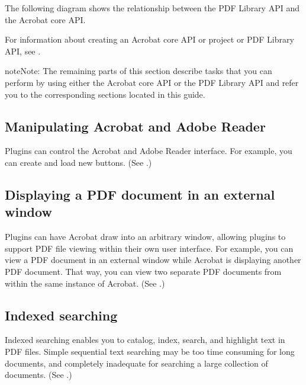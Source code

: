 \documentclass[letterpaper,12pt,english,openany,oneside]{sphinxmanual}
\begin{document}
The following diagram shows the relationship between the PDF Library API and the Acrobat core API.

\noindent{}

For information about creating an Acrobat core API or project or PDF Library API, see .

\begin{sphinxadmonition}{note}{Note:}
The remaining parts of this section describe tasks that you can perform by using either the Acrobat core API or the PDF Library API and refer you to the corresponding sections located in this guide.
\end{sphinxadmonition}


\subsection{Manipulating Acrobat and Adobe Reader}
\label{\detokenize{index:manipulating-acrobat-and-adobe-reader}}
Plugins can control the Acrobat and Adobe Reader interface. For example, you can create and load new buttons. (See .)


\subsection{Displaying a PDF document in an external window}
\label{\detokenize{index:displaying-a-pdf-document-in-an-external-window}}
Plugins can have Acrobat draw into an arbitrary window, allowing plugins to support PDF file viewing within their own user interface. For example, you can view a PDF document in an external window while Acrobat is displaying another PDF document. That way, you can view two separate PDF documents from within the same instance of Acrobat. (See .)


\subsection{Indexed searching}
\label{\detokenize{index:indexed-searching}}
Indexed searching enables you to catalog, index, search, and highlight text in PDF files. Simple sequential text searching may be too time consuming for long documents, and completely inadequate for searching a large collection of documents. (See .)
\end{document}
